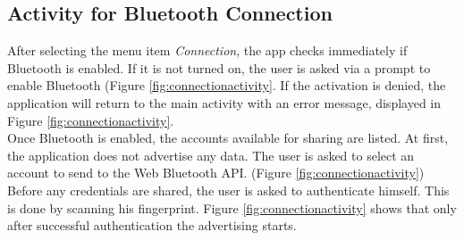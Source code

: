 
\subsection{Activity for Bluetooth Connection}
After selecting the menu item \textit{Connection}, the app checks immediately if Bluetooth is enabled. If it is not turned on, the user is asked via a prompt to enable Bluetooth (Figure \ref{fig:connectionactivity}\protect{}.
If the activation is denied, the application will return to the main activity with an error message, displayed in Figure \ref{fig:connectionactivity}\protect{}. \\
Once Bluetooth is enabled, the accounts available for sharing are listed. At first, the application does not advertise any data. The user is asked to select an account to send to the Web Bluetooth API. (Figure \ref{fig:connectionactivity}\protect{}) Before any credentials are shared, the user is asked to authenticate himself. This is done by scanning his fingerprint. Figure \ref{fig:connectionactivity}\protect{} shows that only after successful authentication the advertising starts.

